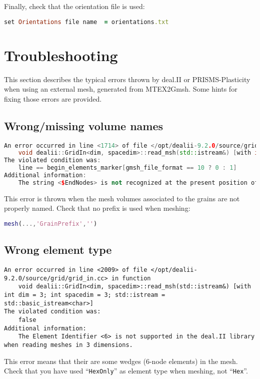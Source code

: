 \documentclass[a4paper]{scrartcl}
\begin{document}
Finally, check that the orientation file is used:
\begin{lstlisting}[language=ruby]
set Orientations file name  = orientations.txt
\end{lstlisting}

	
	\section{Troubleshooting}
	This section describes the typical errors thrown by deal.II or PRISMS-Plasticity when using an external mesh, generated from MTEX2Gmsh. Some hints for fixing those errors are provided.
	
		\subsection{Wrong/missing volume names}
\begin{lstlisting}[language=c++]
An error occurred in line <1714> of file </opt/dealii-9.2.0/source/grid/grid_in.cc> in function
    void dealii::GridIn<dim, spacedim>::read_msh(std::istream&) [with int dim = 3; int spacedim = 3; std::istream = std::basic_istream<char>]
The violated condition was:
    line == begin_elements_marker[gmsh_file_format == 10 ? 0 : 1]
Additional information:
    The string <$EndNodes> is not recognized at the present position of a Gmsh Mesh file.
\end{lstlisting}
This error is thrown when the mesh volumes associated to the grains are not properly named. Check that no prefix is used when meshing:
	\begin{lstlisting}[language=Matlab]
mesh(...,'GrainPrefix','')
	\end{lstlisting}
	
	
	\subsection{Wrong element type}
\begin{lstlisting}
An error occurred in line <2009> of file </opt/dealii-9.2.0/source/grid/grid_in.cc> in function
    void dealii::GridIn<dim, spacedim>::read_msh(std::istream&) [with int dim = 3; int spacedim = 3; std::istream = std::basic_istream<char>]
The violated condition was:
    false
Additional information:
    The Element Identifier <6> is not supported in the deal.II library when reading meshes in 3 dimensions.
\end{lstlisting}
This error means that their are some wedges (6-node elements) in the mesh. Check that you have used ``\texttt{HexOnly}'' as element type when meshing, not ``\texttt{Hex}''.
	
	


\end{document}
